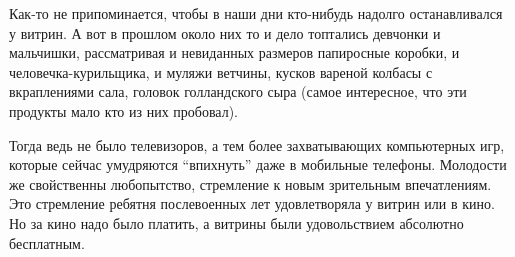 Как-то не припоминается, чтобы в наши дни кто-нибудь надолго останавливался у
витрин. А вот в прошлом около них то и дело топтались девчонки и мальчишки,
рассматривая и невиданных раз­меров папиросные коробки, и человечка-курильщика,
и муляжи ветчины, кусков вареной колбасы с вкраплениями сала, головок
голландского сыра (самое интересное, что эти продукты мало кто из них
пробовал).

Тогда ведь не было телевизоров, а тем более захватыва­ющих компьютерных игр,
которые сейчас умудряются \enquote{впихнуть} даже в мобильные телефоны. Молодости же
свойственны любопытство, стремление к новым зрительным впечатлениям. Это
стремление ребятня послевоенных лет удовлетворяла у витрин или в кино. Но за
кино надо было платить, а витрины были удовольствием абсолютно бесплатным.
